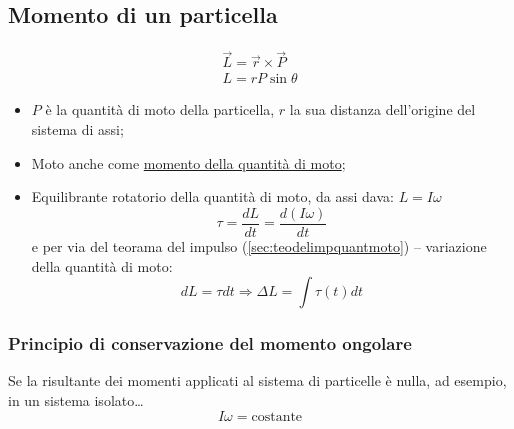 \documentclass{book}
\begin{document}
\subsection{Momento di un particella}
\label{sec:momdiunpart}

\begin{equation}
  \label{eq:momdiunpart}
  \begin{matrix}
    \vec{L}=\vec{r}\times{}\vec{P}\\
    L=rP\sin \theta
  \end{matrix}
\end{equation}
\begin{itemize}
\item $P$ è la quantità di moto della particella, $r$ la sua distanza dell'origine del sistema di assi;
\item Moto anche come \underline{momento della quantità di moto};
\item Equilibrante rotatorio della quantità di moto, da assi dava: $L=I\omega$
  \begin{equation*}
    \tau=\frac{dL}{dt}=\frac{d(I\omega)}{dt}
  \end{equation*}
  e per via del teorama del impulso (\ref{sec:teodelimpquantmoto}) -- variazione della quantità di moto:
  \begin{equation*}
    dL=\tau dt\Rightarrow \Delta L=\int \tau (t)dt
  \end{equation*}
\end{itemize}

\subsubsection{Principio di conservazione del momento ongolare}
\label{sec:princdiconsdelmomang}

Se la risultante dei momenti applicati al sistema di particelle è nulla, ad esempio, in un sistema isolato\dots{}
\begin{equation*}
  I\omega=\text{costante}
\end{equation*}
\end{document}
